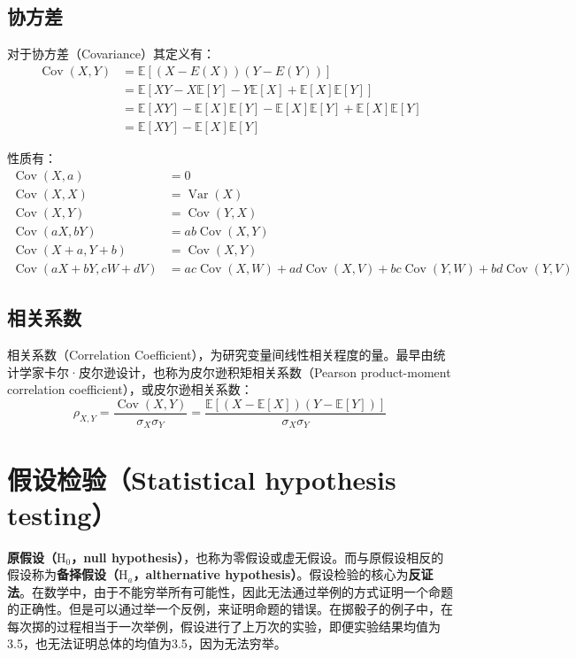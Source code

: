 \documentclass[11pt]{article}
\newcommand{\E}{\mathbb{E}}
\DeclareMathOperator{\Var}{Var}
\DeclareMathOperator{\Cov}{Cov}
\begin{document}
\subsection{协方差}

对于协方差（Covariance）其定义有：
\begin{align*}
    \Cov(X,Y) &= \E[(X-E(X))(Y-E(Y))] \\
    &= \E[XY - X\E[Y] -Y\E[X]+ \E[X]\E[Y]] \\
    &= \E[XY] - \E[X]\E[Y] - \E[X]\E[Y] + \E[X]\E[Y] \\
    &= \E[XY] - \E[X]\E[Y]
\end{align*}

性质有：
\begin{align*}
    \Cov(X,a) &= 0 \\
    \Cov(X,X) &= \Var(X) \\
    \Cov(X,Y) &= \Cov(Y,X) \\
    \Cov(aX,bY) &= ab\Cov(X,Y) \\
    \Cov(X+a,Y+b) &= \Cov(X,Y) \\
    \Cov(aX+bY,cW+dV) &= ac\Cov(X,W)+ad\Cov(X,V)+bc\Cov(Y,W)+bd\Cov(Y,V)
\end{align*}

\subsection{相关系数}

相关系数（Correlation Coefficient），为研究变量间线性相关程度的量。最早由统计学家卡尔·皮尔逊设计，也称为皮尔逊积矩相关系数（Pearson product-moment correlation coefficient），或皮尔逊相关系数：
\begin{equation*}
    \rho_{X,Y} = \frac{\Cov(X,Y)}{\sigma_X\sigma_Y}
    = \frac{\E[(X-\E[X])(Y-\E[Y])]}{\sigma_X\sigma_Y}
\end{equation*}

\section{假设检验（Statistical hypothesis testing）}

\textbf{原假设（$\text{H}_0$，null hypothesis）}，也称为零假设或虚无假设。而与原假设相反的假设称为\textbf{备择假设（$\text{H}_a$，althernative hypothesis）}。假设检验的核心为\textbf{反证法}。在数学中，由于不能穷举所有可能性，因此无法通过举例的方式证明一个命题的正确性。但是可以通过举一个反例，来证明命题的错误。在掷骰子的例子中，在每次掷的过程相当于一次举例，假设进行了上万次的实验，即便实验结果均值为3.5，也无法证明总体的均值为3.5，因为无法穷举。
\end{document}
